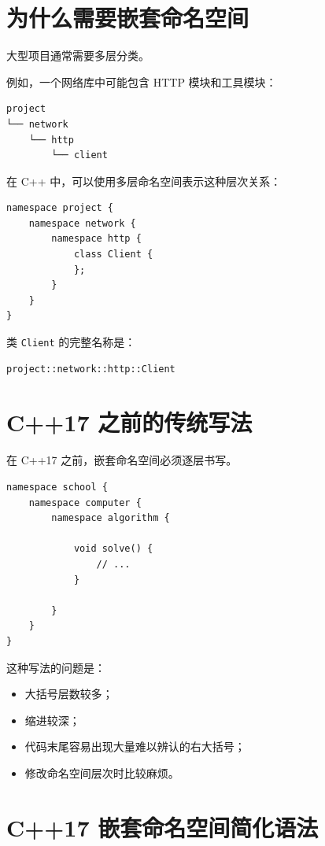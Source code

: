 \documentclass[UTF8,12pt,a4paper]{ctexart}
\begin{document}
\section{为什么需要嵌套命名空间}

大型项目通常需要多层分类。

例如，一个网络库中可能包含 HTTP 模块和工具模块：

\begin{lstlisting}
project
└── network
    └── http
        └── client
\end{lstlisting}

在 C++ 中，可以使用多层命名空间表示这种层次关系：

\begin{lstlisting}
namespace project {
    namespace network {
        namespace http {
            class Client {
            };
        }
    }
}
\end{lstlisting}

类 \texttt{Client} 的完整名称是：

\begin{lstlisting}
project::network::http::Client
\end{lstlisting}

\section{C++17 之前的传统写法}

在 C++17 之前，嵌套命名空间必须逐层书写。

\begin{lstlisting}
namespace school {
    namespace computer {
        namespace algorithm {

            void solve() {
                // ...
            }

        }
    }
}
\end{lstlisting}

这种写法的问题是：

\begin{itemize}
    \item 大括号层数较多；
    \item 缩进较深；
    \item 代码末尾容易出现大量难以辨认的右大括号；
    \item 修改命名空间层次时比较麻烦。
\end{itemize}


\section{C++17 嵌套命名空间简化语法}
\end{document}
